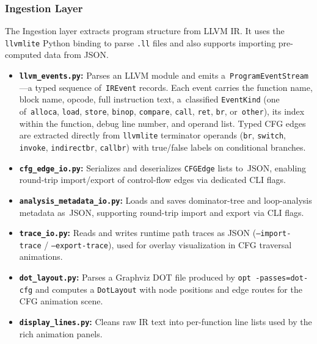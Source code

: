 \subsubsection{Ingestion Layer}
The Ingestion layer extracts program structure from LLVM IR. It uses the \texttt{llvmlite}\cite{llvmlite} Python binding to parse \texttt{.ll} files and also supports importing pre-computed data from JSON.

\begin{itemize}
    \item \textbf{\texttt{llvm\_events.py}:} Parses an LLVM module and emits a~\texttt{ProgramEventStream}---a typed sequence of~\texttt{IREvent} records. Each event carries the function name, block name, opcode, full instruction text, a~classified \texttt{EventKind} (one of~\texttt{alloca}, \texttt{load}, \texttt{store}, \texttt{binop}, \texttt{compare}, \texttt{call}, \texttt{ret}, \texttt{br}, or~\texttt{other}), its index within the function, debug line number, and operand list. Typed CFG edges are extracted directly from \texttt{llvmlite} terminator operands (\texttt{br}, \texttt{switch}, \texttt{invoke}, \texttt{indirectbr}, \texttt{callbr}) with true/false labels on conditional branches.

    \item \textbf{\texttt{cfg\_edge\_io.py}:} Serializes and deserializes \texttt{CFGEdge} lists to~JSON, enabling round-trip import/export of control-flow edges via dedicated CLI flags.

    \item \textbf{\texttt{analysis\_metadata\_io.py}:} Loads and saves dominator-tree and loop-analysis metadata as~JSON, supporting round-trip import and export via CLI flags.

    \item \textbf{\texttt{trace\_io.py}:} Reads and writes runtime path traces as JSON (\texttt{--import-trace} / \texttt{--export-trace}), used for overlay visualization in CFG traversal animations.

    \item \textbf{\texttt{dot\_layout.py}:} Parses a Graphviz DOT file produced by \texttt{opt -passes=dot-cfg} and computes a \texttt{DotLayout} with node positions and edge routes for the CFG animation scene.

    \item \textbf{\texttt{display\_lines.py}:} Cleans raw IR text into per-function line lists used by the rich animation panels.
\end{itemize}

